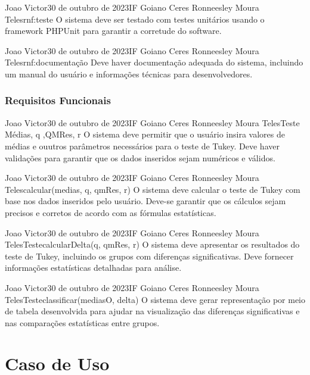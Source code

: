 {Joao Victor}{30 de outubro de 2023}{IF Goiano Ceres}
{Ronneesley Moura Teles}{rnf:teste}
{O sistema deve ser testado com testes unitários usando o framework PHPUnit para garantir a corretude do software.}

{Joao Victor}{30 de outubro de 2023}{IF Goiano Ceres}
{Ronneesley Moura Teles}{rnf:documentação}
{Deve haver documentação adequada do sistema, incluindo um manual do usuário e informações técnicas para desenvolvedores.}


\subsection{Requisitos Funcionais}

{Joao Victor}{30 de outubro de 2023}{IF Goiano Ceres}
{Ronneesley Moura Teles}{Teste}{ Médias, q ,QMRes, r}
{O sistema deve permitir que o usuário insira valores de médias e ouutros parâmetros necessários para o teste de Tukey. Deve haver validações para garantir que os dados inseridos sejam numéricos e válidos.}

{Joao Victor}{30 de outubro de 2023}{IF Goiano Ceres}
{Ronneesley Moura Teles}{}{calcular(medias, q, qmRes, r)}
{O sistema deve calcular o teste de Tukey com base nos dados inseridos pelo usuário.
Deve-se garantir que os cálculos sejam precisos e corretos de acordo com as fórmulas estatísticas.}

{Joao Victor}{30 de outubro de 2023}{IF Goiano Ceres}
{Ronneesley Moura Teles}{Teste}{calcularDelta(q, qmRes, r)}
{O sistema deve apresentar os resultados do teste de Tukey, incluindo os grupos com diferenças significativas.
Deve fornecer informações estatísticas detalhadas para análise.}

{Joao Victor}{30 de outubro de 2023}{IF Goiano Ceres}
{Ronneesley Moura Teles}{Teste}{classificar(mediasO, delta)}
{O sistema deve gerar representação por meio de tabela desenvolvida para ajudar na visualização das diferenças significativas e nas comparações estatísticas entre grupos.}

\chapter{Caso de Uso}

